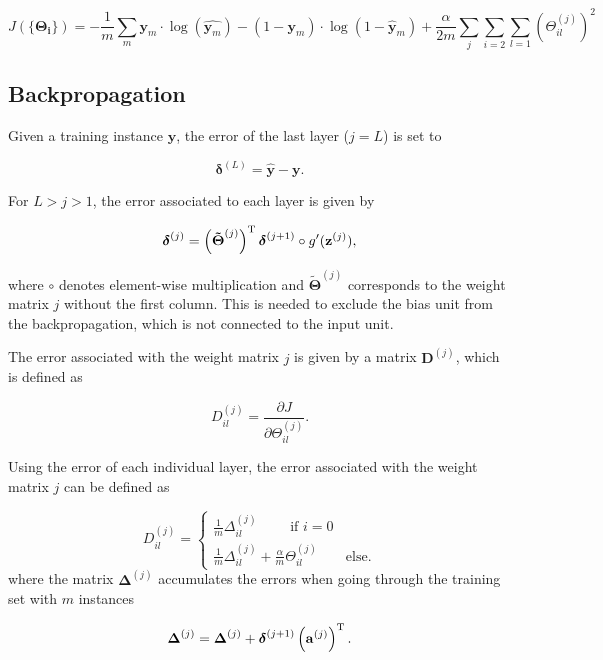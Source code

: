 \documentclass{article}
\begin{document}
\begin{equation}
J(\{\boldsymbol{\Theta_i}\}) = -\frac{1}{m}\sum_m\mathbf{y}_m\cdot\log(\hat{\mathbf{y}_m}) - (1 -\mathbf{y}_m)\cdot\log(1 -\mathbf{\hat{y}}_m) + \frac{\alpha}{2m}\sum_j\sum_{i=2}\sum_{l=1}\left(\Theta^{(j)}_{il}\right)^2
\end{equation}

\subsection*{Backpropagation}

Given a training instance $\mathbf{y}$, the error of the last layer ($j=L$) is set to

\begin{equation}
\boldsymbol{\delta}^{(L)} = \hat{\mathbf{y}} - \mathbf{y}.
\end{equation}

For $L > j >1$, the error associated to each layer is given by

\begin{equation}
\boldsymbol{\delta}^{(j)} = \left(\boldsymbol{\tilde{\Theta}}^{(j)}\right)^{\rm T} \boldsymbol{\delta}^{(j+1)} \circ g'(\mathbf{z}^{(j)}),
\end{equation}

where $\circ$ denotes element-wise multiplication and $\boldsymbol{\tilde{\Theta}}^{(j)}$ corresponds to the weight matrix $j$ without the first column. This is needed to exclude the bias unit from the backpropagation, which is not connected to the input unit.

The error associated with the weight matrix $j$ is given by a matrix $\mathbf{D}^{(j)}$, which is defined as

\begin{equation}
D^{(j)}_{il} = \frac{\partial J}{\partial \Theta^{(j)}_{il}}.
\end{equation}

Using the error of each individual layer, the error associated with the weight matrix $j$ can be defined as

\begin{equation}
D^{(j)}_{il} = \begin{cases} \frac{1}{m} \Delta^{(j)}_{il} \qquad \text{  if } i=0 \\ \frac{1}{m} \Delta^{(j)}_{il} + \frac{\alpha}{m} \Theta^{(j)}_{il} \qquad \text{else}.
\end{cases}
\end{equation}
where the matrix $\boldsymbol{\Delta}^{(j)}$ accumulates the errors when going through the training set with $m$ instances

\begin{equation}
\boldsymbol{\Delta}^{(j)} = \boldsymbol{\Delta}^{(j)} + \boldsymbol{\delta}^{(j+1)}\left(\mathbf{a}^{(j)}\right)^{\rm T}.
\end{equation}
\end{document}
